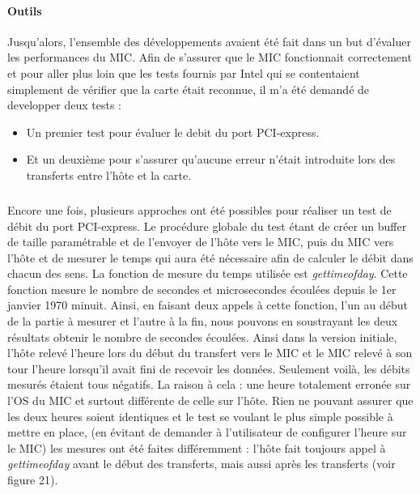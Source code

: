 \documentclass[11pt]{article}
\begin{document}
				\paragraph{Outils}
				Jusqu'alors, l'ensemble des développements avaient été fait dans un but d'évaluer les performances du MIC. 
				Afin de s'assurer que le MIC fonctionnait correctement et pour aller plus loin que les tests fournis par 
				Intel qui se contentaient simplement de vérifier que la carte était reconnue, il m'a été demandé de 
				developper deux tests : \newline
				\begin{itemize}
				\item Un premier test pour évaluer le debit du port PCI-express.
				\item Et un deuxième pour s'assurer qu'aucune erreur n'était introduite lors des transferts entre
				l'hôte et la carte.
				\end{itemize}
					\subparagraph{}
					Encore une fois, plusieurs approches ont été possibles pour réaliser un test de débit du port PCI-express.
					Le procédure globale du test étant de créer un buffer de taille paramétrable et de l'envoyer de l'hôte 
					vers le MIC, puis du MIC vers l'hôte et de mesurer le temps qui aura été nécessaire afin de calculer le 
					débit dans chacun des sens. La fonction de mesure du temps utilisée est \emph{gettimeofday}. Cette fonction 
					mesure le nombre de secondes et microsecondes écoulées depuis le 1er janvier 1970 minuit. Ainsi, en faisant 
					deux appels à cette fonction, l'un au début de la partie à mesurer et l'autre à la fin, nous pouvons en 
					soustrayant les deux résultats obtenir le nombre de secondes écoulées.\newline
					Ainsi dans la version initiale, l'hôte relevé l'heure lors du début du transfert vers le MIC et le MIC relevé 
					à son tour l'heure lorsqu'il avait fini de recevoir les données. Seulement voilà, les débits mesurés étaient 
					tous négatifs. La raison à cela : une heure totalement erronée sur l'OS du MIC et surtout différente de celle 
					sur l'hôte. Rien ne pouvant assurer que les deux heures soient identiques et le test se voulant le plus 
					simple possible à mettre en place, (en évitant de demander à l'utilisateur de configurer l'heure sur le MIC) 
					les mesures ont été faites différemment : \newline
					l'hôte fait toujours appel à \emph{gettimeofday} avant le début des transferts, mais aussi après les 
					transferts (voir figure 21).
\end{document}
